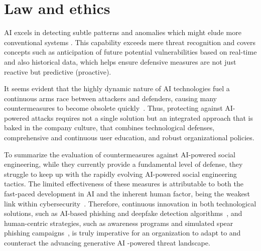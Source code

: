 \section{Law and ethics}
\begin{comment}    
    - Deepfake content detection
    - Spear phishing detection
\end{comment}


    AI excels in detecting subtle patterns and anomalies which might elude more conventional systems \citep{fakhouri_AI_Driven_Solutions_SE_Attacks_2024}. This capability exceeds mere threat recognition and covers concepts such as anticipation of future potential vulnerabilities based on real-time and also historical data, which helps ensure defensive measures are not just reactive but predictive (proactive).

It seems evident that the highly dynamic nature of AI technologies fuel a continuous arms race between attackers and defenders, causing many countermeasures to become obsolete quickly~\citep{fakhouri_AI_Driven_Solutions_SE_Attacks_2024}. Thus, protecting against AI-powered attacks requires not a single solution but an integrated approach that is baked in the company culture, that combines technological defenses, comprehensive and continuous user education, and robust organizational policies.

To summarize the evaluation of countermeasures against AI-powered social engineering, while they currently provide a fundamental level of defense, they struggle to keep up with the rapidly evolving AI-powered social engineering tactics. The limited effectiveness of these measures is attributable to both the fast-paced development in AI and the inherent human factor, being the weakest link within cybersecurity~\citep{mitnick_The_Art_of_Deception_2003}. Therefore, continuous innovation in both technological solutions, such as AI-based phishing and deepfake detection algorithms~\citep{mirsky_Creation_Detection_Deepfakes_2021}, and human-centric strategies, such as awareness programs and simulated spear phishing campaigns~\citep{hadnagy_Social_Engineering_The_Science_2018}, is truly imperative for an organization to adapt to and counteract the advancing generative AI -powered threat landscape.

